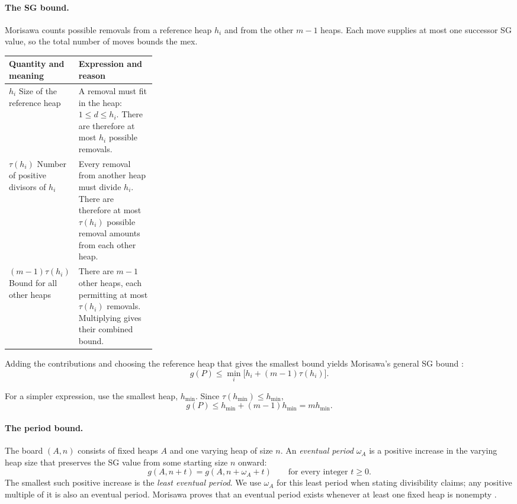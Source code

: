 \documentclass[11pt]{article}
\begin{document}
\paragraph{The SG bound.}
Morisawa counts possible removals from a reference heap $h_i$
and from the other $m-1$ heaps. Each move supplies at most one
successor SG value, so the total number of moves bounds the mex.

\begin{center}
\begin{tabularx}{\linewidth}{@{}L{0.29\linewidth}Y@{}}
\toprule
Quantity and meaning & Expression and reason \\
\midrule
$h_i$\newline
Size of the reference heap
  & A removal must fit in the heap: $1\le d\le h_i$.
    There are therefore at most $h_i$ possible removals. \\
\addlinespace[9pt]

$\tau(h_i)$\newline
Number of positive divisors of $h_i$
  & Every removal from another heap must divide $h_i$.
    There are therefore at most $\tau(h_i)$ possible removal
    amounts from each other heap. \\
\addlinespace[9pt]

$(m-1)\tau(h_i)$\newline
Bound for all other heaps
  & There are $m-1$ other heaps, each permitting at most
    $\tau(h_i)$ removals. Multiplying gives their combined bound. \\
\bottomrule
\end{tabularx}
\end{center}

Adding the contributions and choosing the reference heap that
gives the smallest bound yields Morisawa's general SG bound
\cite[Lemma 5.2]{Morisawa2026}:
\begin{equation}
 \boxed{
 g(P)\le\min_i\bigl[h_i+(m-1)\tau(h_i)\bigr].
 }
 \label{eq:oldbound}
\end{equation}

For a simpler expression, use the smallest heap, $h_{\min}$.
Since $\tau(h_{\min})\le h_{\min}$,
\[
 g(P)\le h_{\min}+(m-1)h_{\min}=mh_{\min}.
\]

\paragraph{The period bound.}
The board $(A,n)$ consists of fixed heaps $A$ and one varying
heap of size $n$. An \emph{eventual period} $\omega_A$ is a
positive increase in the varying heap size that preserves the
SG value from some starting size $n$ onward:
\[
 \boxed{
 g(A,n+t)=g(A,n+\omega_A+t)
 \qquad\text{for every integer }t\ge0.
 }
\]
The smallest such positive increase is the \emph{least eventual period}.
We use $\omega_A$ for this least period when stating divisibility claims;
any positive multiple of it is also an eventual period.
Morisawa proves that an eventual period exists whenever at least
one fixed heap is nonempty
\cite[Theorem 2.5]{Morisawa2026}.
\end{document}
